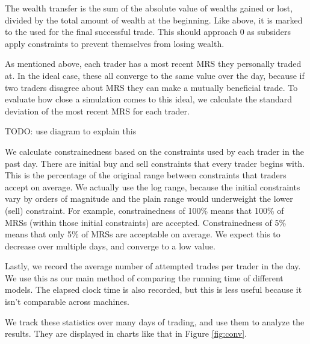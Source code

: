 \documentclass[12pt,a4paper,titlepage]{article}
\begin{document}
The wealth transfer is the sum of the absolute value of wealths gained or lost, divided by the total amount of wealth at the beginning.
Like above, it is marked to the used for the final successful trade.
This should approach 0 as subsiders apply constraints to prevent themselves from losing wealth.

As mentioned above, each trader has a most recent MRS they personally traded at.
In the ideal case, these all converge to the same value over the day, because if two traders disagree about MRS they can make a mutually beneficial trade.
To evaluate how close a simulation comes to this ideal, we calculate the standard deviation of the most recent MRS for each trader.

TODO: use diagram to explain this
    
We calculate constrainedness based on the constraints used by each trader in the past day.
There are initial buy and sell constraints that every trader begins with.
This is the percentage of the original range between constraints that traders accept on average.
We actually use the log range, because the initial constraints vary by orders of magnitude and the plain range would underweight the lower (sell) constraint.
For example, constrainedness of 100\% means that 100\% of MRSs (within those initial constraints) are accepted.
Constrainedness of 5\% means that only 5\% of MRSs are acceptable on average.
We expect this to decrease over multiple days, and converge to a low value.

Lastly, we record the average number of attempted trades per trader in the day.
We use this as our main method of comparing the running time of different models.
The elapsed clock time is also recorded, but this is less useful because it isn't comparable across machines.


We track these statistics over many days of trading, and use them to analyze the results.
They are displayed in charts like that in Figure \ref{fig:conv}.
\end{document}

